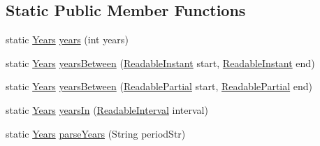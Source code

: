 \subsection*{Static Public Member Functions}
\begin{DoxyCompactItemize}
\item 
static \hyperlink{classorg_1_1joda_1_1time_1_1_years}{Years} \hyperlink{classorg_1_1joda_1_1time_1_1_years_ae2b5cf7d5d98695f37d18f274a0e62a5}{years} (int years)
\item 
static \hyperlink{classorg_1_1joda_1_1time_1_1_years}{Years} \hyperlink{classorg_1_1joda_1_1time_1_1_years_ac2225e689b50e70dc3301a4a3fa6f083}{years\-Between} (\hyperlink{interfaceorg_1_1joda_1_1time_1_1_readable_instant}{Readable\-Instant} start, \hyperlink{interfaceorg_1_1joda_1_1time_1_1_readable_instant}{Readable\-Instant} end)
\item 
static \hyperlink{classorg_1_1joda_1_1time_1_1_years}{Years} \hyperlink{classorg_1_1joda_1_1time_1_1_years_a26d7946c6cedc91706d8749aba4fea7a}{years\-Between} (\hyperlink{interfaceorg_1_1joda_1_1time_1_1_readable_partial}{Readable\-Partial} start, \hyperlink{interfaceorg_1_1joda_1_1time_1_1_readable_partial}{Readable\-Partial} end)
\item 
static \hyperlink{classorg_1_1joda_1_1time_1_1_years}{Years} \hyperlink{classorg_1_1joda_1_1time_1_1_years_ad4f344da4f587660cf0a893da2277e62}{years\-In} (\hyperlink{interfaceorg_1_1joda_1_1time_1_1_readable_interval}{Readable\-Interval} interval)
\item 
static \hyperlink{classorg_1_1joda_1_1time_1_1_years}{Years} \hyperlink{classorg_1_1joda_1_1time_1_1_years_abf836c444afd4a303a82fdb463893871}{parse\-Years} (String period\-Str)
\end{DoxyCompactItemize}
